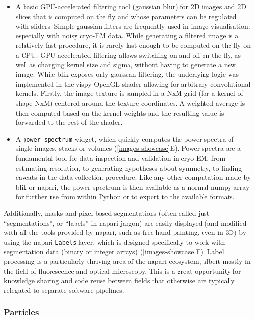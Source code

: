 \begin{itemize} 
    \item A basic GPU-accelerated filtering tool (gaussian blur) for 2D images and 2D slices that is computed on the fly and whose parameters can be regulated with sliders. Simple gaussian filters are frequently used in image visualisation, especially with noisy cryo-EM data. While generating a filtered image is a relatively fast procedure, it is rarely fast enough to be computed on the fly on a CPU. GPU-accelerated filtering allows switching on and off on the fly, as well as changing kernel size and sigma, without having to generate a new image. While blik exposes only gaussian filtering, the underlying logic was implemented in the vispy OpenGL shader allowing for arbitrary convolutional kernels. Firstly, the image texture is sampled in a NxM grid (for a kernel of shape NxM) centered around the texture coordinates. A weighted average is then computed based on the kernel weights and the resulting value is forwarded to the rest of the shader. 
    \item A \texttt{power\ spectrum} widget, which quickly computes the power spectra of single images, stacks or volumes (\autoref{images-showcase}E). Power spectra are a fundamental tool for data inspection and validation in cryo-EM, from estimating resolution, to generating hypotheses about symmetry, to finding caveats in the data collection procedure. Like any other computation made by blik or napari, the power spectrum is then available as a normal numpy array for further use from within Python or to export to the available formats.
\end{itemize}

Additionally, masks and pixel-based segmentations (often called just ``segmentations'', or ``labels'' in napari jargon) are easily displayed (and modified with all the tools provided by napari, such as free-hand painting, even in 3D) by using the napari \texttt{Labels} layer, which is designed specifically to work with segmentation data (binary or integer arrays) (\autoref{images-showcase}F). Label processing is a particularly thriving area of the napari ecosystem, albeit mostly in the field of fluorescence and optical microscopy. This is a great opportunity for knowledge sharing and code reuse between fields that otherwise are typically relegated to separate software pipelines.

\subsubsection{Particles}\label{particles}

